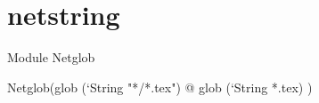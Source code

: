 \section{netstring}



Module Netglob

\begin{redcode}
Netglob(glob (`String "*/*.tex") @
glob (`String *.tex)
)
\end{redcode}
